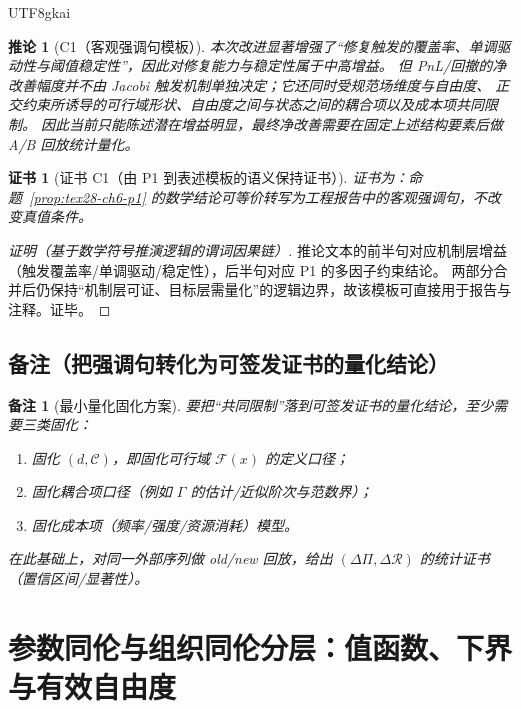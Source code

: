 \documentclass[12pt]{article}
\newtheorem{corollary}{推论}[section]
\newtheorem{remark}{备注}[section]
\newtheorem{Certificate}{证书}[section]
\begin{document}
\begin{CJK*}{UTF8}{gkai}
\begin{corollary}[C1（客观强调句模板）]
\label{cor:tex28-ch6-c1}
本次改进显著增强了“修复触发的覆盖率、单调驱动性与阈值稳定性”，因此对修复能力与稳定性属于中高增益。
但 PnL/回撤的净改善幅度并不由 Jacobi 触发机制单独决定；它还同时受规范场维度与自由度、
正交约束所诱导的可行域形状、自由度之间与状态之间的耦合项以及成本项共同限制。
因此当前只能陈述潜在增益明显，最终净改善需要在固定上述结构要素后做 A/B 回放统计量化。
\end{corollary}

\begin{Certificate}[证书 C1（由 P1 到表述模板的语义保持证书）]
\label{cert:tex28-ch6-c1}
证书为：命题~\ref{prop:tex28-ch6-p1} 的数学结论可等价转写为工程报告中的客观强调句，不改变真值条件。
\end{Certificate}

\begin{proof}[证明（基于数学符号推演逻辑的谓词因果链）]
推论文本的前半句对应机制层增益（触发覆盖率/单调驱动/稳定性），后半句对应 P1 的多因子约束结论。
两部分合并后仍保持“机制层可证、目标层需量化”的逻辑边界，故该模板可直接用于报告与注释。证毕。
\end{proof}

\subsection{备注（把强调句转化为可签发证书的量化结论）}
\label{subsec:tex28-ch6-remarks}

\begin{remark}[最小量化固化方案]
要把“共同限制”落到可签发证书的量化结论，至少需要三类固化：
\begin{enumerate}
  \item 固化 $(d,\mathcal{C})$，即固化可行域 $\mathcal{F}(x)$ 的定义口径；
  \item 固化耦合项口径（例如 $\Gamma$ 的估计/近似阶次与范数界）；
  \item 固化成本项（频率/强度/资源消耗）模型。
\end{enumerate}
在此基础上，对同一外部序列做 old/new 回放，给出 $(\Delta\Pi,\Delta\mathcal{R})$ 的统计证书（置信区间/显著性）。
\end{remark}

\clearpage

\section{参数同伦与组织同伦分层：值函数、下界与有效自由度}
\label{sec:tex28-ch7}


\end{CJK*}
\end{document}
